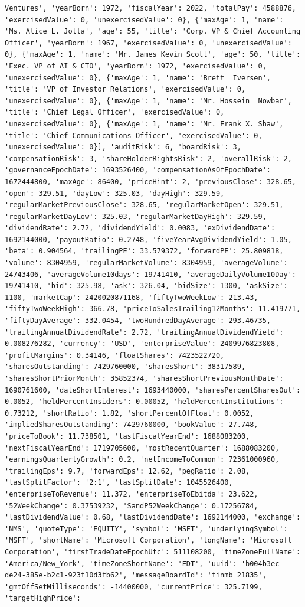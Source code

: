 \documentclass[
  letterpaper,
]{report}
\begin{document}
\begin{verbatim}
Ventures', 'yearBorn': 1972, 'fiscalYear': 2022, 'totalPay': 4588876, 'exercisedValue': 0, 'unexercisedValue': 0}, {'maxAge': 1, 'name': 'Ms. Alice L. Jolla', 'age': 55, 'title': 'Corp. VP & Chief Accounting Officer', 'yearBorn': 1967, 'exercisedValue': 0, 'unexercisedValue': 0}, {'maxAge': 1, 'name': 'Mr. James Kevin Scott', 'age': 50, 'title': 'Exec. VP of AI & CTO', 'yearBorn': 1972, 'exercisedValue': 0, 'unexercisedValue': 0}, {'maxAge': 1, 'name': 'Brett  Iversen', 'title': 'VP of Investor Relations', 'exercisedValue': 0, 'unexercisedValue': 0}, {'maxAge': 1, 'name': 'Mr. Hossein  Nowbar', 'title': 'Chief Legal Officer', 'exercisedValue': 0, 'unexercisedValue': 0}, {'maxAge': 1, 'name': 'Mr. Frank X. Shaw', 'title': 'Chief Communications Officer', 'exercisedValue': 0, 'unexercisedValue': 0}], 'auditRisk': 6, 'boardRisk': 3, 'compensationRisk': 3, 'shareHolderRightsRisk': 2, 'overallRisk': 2, 'governanceEpochDate': 1693526400, 'compensationAsOfEpochDate': 1672444800, 'maxAge': 86400, 'priceHint': 2, 'previousClose': 328.65, 'open': 329.51, 'dayLow': 325.03, 'dayHigh': 329.59, 'regularMarketPreviousClose': 328.65, 'regularMarketOpen': 329.51, 'regularMarketDayLow': 325.03, 'regularMarketDayHigh': 329.59, 'dividendRate': 2.72, 'dividendYield': 0.0083, 'exDividendDate': 1692144000, 'payoutRatio': 0.2748, 'fiveYearAvgDividendYield': 1.05, 'beta': 0.904564, 'trailingPE': 33.579372, 'forwardPE': 25.809818, 'volume': 8304959, 'regularMarketVolume': 8304959, 'averageVolume': 24743406, 'averageVolume10days': 19741410, 'averageDailyVolume10Day': 19741410, 'bid': 325.98, 'ask': 326.04, 'bidSize': 1300, 'askSize': 1100, 'marketCap': 2420020871168, 'fiftyTwoWeekLow': 213.43, 'fiftyTwoWeekHigh': 366.78, 'priceToSalesTrailing12Months': 11.419771, 'fiftyDayAverage': 332.0454, 'twoHundredDayAverage': 293.46735, 'trailingAnnualDividendRate': 2.72, 'trailingAnnualDividendYield': 0.008276282, 'currency': 'USD', 'enterpriseValue': 2409976823808, 'profitMargins': 0.34146, 'floatShares': 7423522720, 'sharesOutstanding': 7429760000, 'sharesShort': 38317589, 'sharesShortPriorMonth': 35852374, 'sharesShortPreviousMonthDate': 1690761600, 'dateShortInterest': 1693440000, 'sharesPercentSharesOut': 0.0052, 'heldPercentInsiders': 0.00052, 'heldPercentInstitutions': 0.73212, 'shortRatio': 1.82, 'shortPercentOfFloat': 0.0052, 'impliedSharesOutstanding': 7429760000, 'bookValue': 27.748, 'priceToBook': 11.738501, 'lastFiscalYearEnd': 1688083200, 'nextFiscalYearEnd': 1719705600, 'mostRecentQuarter': 1688083200, 'earningsQuarterlyGrowth': 0.2, 'netIncomeToCommon': 72361000960, 'trailingEps': 9.7, 'forwardEps': 12.62, 'pegRatio': 2.08, 'lastSplitFactor': '2:1', 'lastSplitDate': 1045526400, 'enterpriseToRevenue': 11.372, 'enterpriseToEbitda': 23.622, '52WeekChange': 0.37539232, 'SandP52WeekChange': 0.17256784, 'lastDividendValue': 0.68, 'lastDividendDate': 1692144000, 'exchange': 'NMS', 'quoteType': 'EQUITY', 'symbol': 'MSFT', 'underlyingSymbol': 'MSFT', 'shortName': 'Microsoft Corporation', 'longName': 'Microsoft Corporation', 'firstTradeDateEpochUtc': 511108200, 'timeZoneFullName': 'America/New_York', 'timeZoneShortName': 'EDT', 'uuid': 'b004b3ec-de24-385e-b2c1-923f10d3fb62', 'messageBoardId': 'finmb_21835', 'gmtOffSetMilliseconds': -14400000, 'currentPrice': 325.7199, 'targetHighPrice': 
\end{verbatim}
\end{document}
